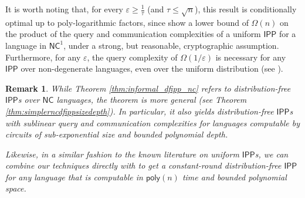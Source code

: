 \documentclass[11pt]{article}
\newtheorem{remark}{Remark}
\newcommand{\poly}{\mathsf{poly}}
\newcommand{\NC}{\mathsf{NC}}
\newcommand{\IPP}{\mathsf{IPP}}
\newcommand{\eps}{\varepsilon}
\begin{document}
It is worth noting that, for every $\eps\geq \frac{1}{\tau}$ (and $\tau \leq \sqrt{n}$), this result is conditionally optimal up to poly-logarithmic factors, since \cite{KR15} show a lower bound of $\Omega(n)$ on the product of the query and communication complexities of a uniform $\IPP$ for a language in $\NC^1$, under a strong, but reasonable, cryptographic assumption. Furthermore, for any $\varepsilon$, the query complexity of $\Omega(1/\varepsilon)$ is necessary for any $\IPP$ over non-degenerate languages, even over the uniform distribution (see \cite[Remark 1.2]{RVW}).

\begin{remark}
While Theorem \ref{thm:informal_dfipp_nc} refers to distribution-free $\IPP$s over $\NC$ languages, the theorem is more general (see Theorem \ref{thm:simplerncdfippsizedepth}). In particular, it also yields distribution-free $\IPP$s with sublinear query and communication complexities for languages computable by circuits of sub-exponential size and bounded polynomial depth.

Likewise, in a similar fashion to the known literature on uniform $\IPP$s, we can combine our techniques directly with \cite{RRR21} to get a constant-round distribution-free $\IPP$ for any language that is computable in $\poly(n)$ time and bounded polynomial space.
\end{remark}
\end{document}
